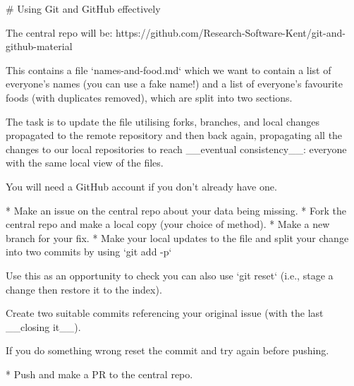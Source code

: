# Using Git and GitHub effectively

The central repo will be: https://github.com/Research-Software-Kent/git-and-github-material

This contains a file `names-and-food.md` which we want to contain a list of everyone's names (you can use a fake name!) and a list of everyone's favourite foods (with duplicates removed), which are split into two sections.

The task is to update the file utilising forks, branches, and local changes propagated to the remote repository and then back again, propagating all the changes to our local repositories to reach __eventual consistency__: everyone with the same local view of the files.

You will need a GitHub account if you don't already have one.

* Make an issue on the central repo about your data being missing.
* Fork the central repo and make a local copy (your choice of method).
* Make a new branch for your fix.
* Make your local updates to the file and split your change into two commits by using `git add -p`

Use this as an opportunity to check you can also use
 `git reset` (i.e., stage a change then restore it to the index).

Create two suitable commits referencing your original issue (with
the last __closing it__).

If you do something wrong reset the commit and try again before pushing.

* Push and make a PR to the central repo.
